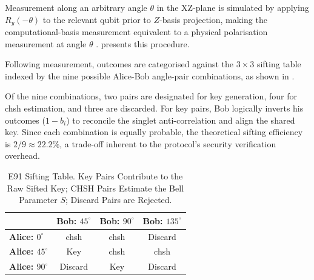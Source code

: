 \documentclass[11pt, a4paper]{report}
\renewcommand{\footnotesize}{\fontsize{9}{10}\selectfont}
\begin{document}
\newpage
Measurement along an arbitrary angle $\theta$ in the XZ-plane is simulated by applying $R_y(-\theta)$ to the relevant \gls{qubit} prior to $Z$-basis projection, making the computational-basis measurement equivalent to a physical polarisation measurement at angle $\theta$ \cite{e91Qiskit}.  presents this procedure.

Following measurement, outcomes are categorised against the $3 \times 3$ \gls{sifting} table indexed by the nine possible Alice-Bob angle-pair combinations, as shown in .

Of the nine combinations, two pairs are designated for key generation, four for \gls{chsh} estimation, and three are discarded. For key pairs, Bob logically inverts his outcomes ($1 - b_i$) to reconcile the singlet anti-correlation and align the shared key. Since each combination is equally probable, the theoretical \gls{sifting} efficiency is $2/9 \approx 22.2\%$, a trade-off inherent to the protocol's security verification overhead.

\begin{table}[htbp]
\centering
\caption{E91 Sifting Table. Key Pairs Contribute to the Raw Sifted Key; CHSH Pairs Estimate the Bell Parameter $S$; Discard Pairs are Rejected.}
\label{tab:e91_sift}
\footnotesize
\begin{tabular}{lccc}
\toprule
 & \textbf{Bob: $45^\circ$} & \textbf{Bob: $90^\circ$} & \textbf{Bob: $135^\circ$} \\
\midrule
\textbf{Alice: $0^\circ$}  & \gls{chsh} & \gls{chsh} & Discard \\
\textbf{Alice: $45^\circ$} & Key        & \gls{chsh} & \gls{chsh} \\
\textbf{Alice: $90^\circ$} & Discard    & Key        & Discard \\
\bottomrule
\end{tabular}
\end{table}

\begin{algorithm}[htbp]
    \caption{E91 Angular Measurement.}\label{alg:e91_meas}
\end{algorithm}
\end{document}
